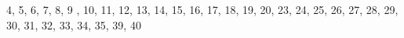 4, 5, 6, 7, 8, 9 , 10, 11, 12,  13, 14, 15, 16,
17, 18, 19, 20,  23, 24, 25, 26, 27, 28, 29, 30,
31, 32, 33, 34, 35, 39, 40